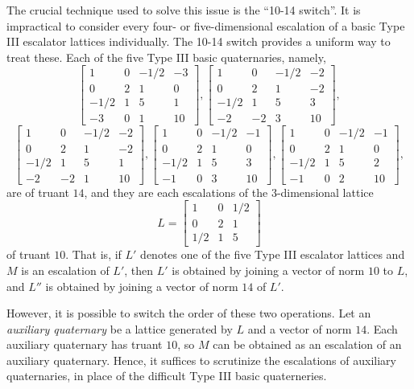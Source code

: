\documentclass[letterpaper, 12pt]{article}
\begin{document}
The crucial technique used to solve this issue is the ``10-14 switch''.
It is impractical to consider every four- or five-dimensional escalation of a basic Type III escalator lattices individually.
The 10-14 switch provides a uniform way to treat these.
Each of the five Type III basic quaternaries, namely,
\[\begin{bmatrix} 1 & 0 & -1/2 & -3 \\ 0 & 2 & 1 & 0 \\ -1/2 & 1 & 5 & 1 \\ -3 & 0 & 1 & 10 \end{bmatrix}, \begin{bmatrix} 1 & 0 & -1/2 & -2 \\ 0 & 2 & 1 & -2 \\ -1/2 & 1 & 5 & 3 \\ -2 & -2 & 3 & 10 \end{bmatrix},\]
\[\begin{bmatrix} 1 & 0 & -1/2 & -2 \\ 0 & 2 & 1 & -2 \\ -1/2 & 1 & 5 & 1 \\ -2 & -2 & 1 & 10 \end{bmatrix}, \begin{bmatrix} 1 & 0 & -1/2 & -1 \\ 0 & 2 & 1 & 0 \\ -1/2 & 1 & 5 & 3 \\ -1 & 0 & 3 & 10 \end{bmatrix}, \begin{bmatrix} 1 & 0 & -1/2 & -1 \\ 0 & 2 & 1 & 0 \\ -1/2 & 1 & 5 & 2 \\ -1 & 0 & 2 & 10 \end{bmatrix},\]
are of truant $14$, and they are each escalations of the $3$-dimensional lattice
\[L = \begin{bmatrix} 1 & 0 & 1/2 \\ 0 & 2 & 1 \\ 1/2 & 1 & 5 \end{bmatrix}\]
of truant $10$.
That is, if $L'$ denotes one of the five Type III escalator lattices and $M$ is an escalation of $L'$, then $L'$ is obtained by joining a vector of norm $10$ to $L$, and $L''$ is obtained by joining a vector of norm $14$ of $L'$.

However, it is possible to switch the order of these two operations.
Let an \emph{auxiliary quaternary} be a lattice generated by $L$ and a vector of norm $14$.
Each auxiliary quaternary has truant $10$, so $M$ can be obtained as an escalation of an auxiliary quaternary.
Hence, it suffices to scrutinize the escalations of auxiliary quaternaries, in place of the difficult Type III basic quaterneries.
\end{document}
